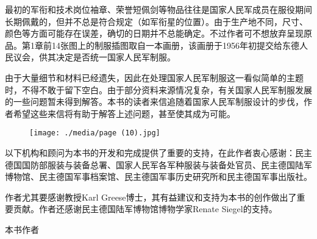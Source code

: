 最初的军衔和技术岗位袖章、荣誉短佩剑等物品往往是国家人民军成员在服役期间长期佩戴的，但并不总是符合规定（如军衔星的位置）。由于生产地不同，尺寸、颜色等方面可能存在误差，确切的日期并不总能确定。不过作者可不想放弃呈现原品。第1章前14张图上的制服插图取自一本画册，该画册于1956年初提交给东德人民议会，供其决定是否统一国家人民军制服。

由于大量细节和材料已经遗失，因此在处理国家人民军制服这一看似简单的主题时，不得不敢于留下空白。由于部分资料来源情况复杂，有关国家人民军制服发展的一些问题暂未得到解答。本书的读者来信追随着国家人民军制服设计的步伐，作者希望这些来信将有助于解答上述问题，甚至使其成为可能。

\begin{figure}
\texttt{[image: ./media/page (10).jpg]}
\end{figure}

以下机构和顾问为本书的开发和完成提供了重要的支持，在此作者衷心感谢：民主德国国防部服装与装备总署、国家人民军各军种服装与装备处官员、民主德国陆军博物馆、民主德国军事档案馆、民主德国军事历史研究所和民主德国军事出版社。

作者尤其要感谢教授Karl Greese博士，其有益建议和支持为本书的创作做出了重要贡献。作者还感谢民主德国陆军博物馆博物学家Renate Siegel的支持。

\hfill 本书作者%